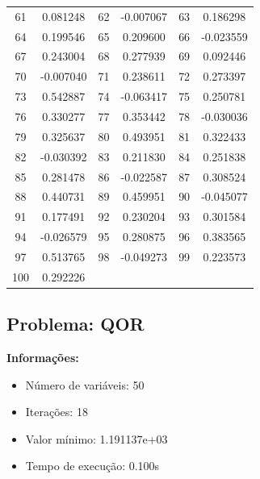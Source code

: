 \documentclass[12pt]{article}
\begin{document}
\begin{longtable}{@{}cc|cc|cc@{}}
61 & 0.081248 & 62 & -0.007067 & 63 & 0.186298 \\
64 & 0.199546 & 65 & 0.209600 & 66 & -0.023559 \\
67 & 0.243004 & 68 & 0.277939 & 69 & 0.092446 \\
70 & -0.007040 & 71 & 0.238611 & 72 & 0.273397 \\
73 & 0.542887 & 74 & -0.063417 & 75 & 0.250781 \\
76 & 0.330277 & 77 & 0.353442 & 78 & -0.030036 \\
79 & 0.325637 & 80 & 0.493951 & 81 & 0.322433 \\
82 & -0.030392 & 83 & 0.211830 & 84 & 0.251838 \\
85 & 0.281478 & 86 & -0.022587 & 87 & 0.308524 \\
88 & 0.440731 & 89 & 0.459951 & 90 & -0.045077 \\
91 & 0.177491 & 92 & 0.230204 & 93 & 0.301584 \\
94 & -0.026579 & 95 & 0.280875 & 96 & 0.383565 \\
97 & 0.513765 & 98 & -0.049273 & 99 & 0.223573 \\
100 & 0.292226 &  &  &  &  \\

\end{longtable}


\newpage            
\subsection{Problema: QOR}

\textbf{Informações:}
\begin{itemize}
\item Número de variáveis: 50
\item Iterações: 18
\item Valor mínimo: 1.191137e+03
\item Tempo de execução: 0.100s
\end{itemize}
\end{document}
